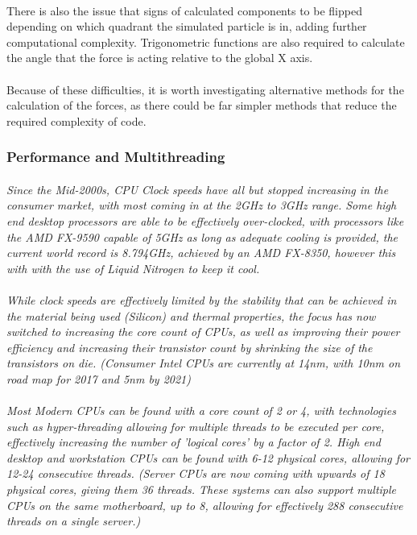 \paragraph{}
There is also the issue that signs of calculated components to be flipped depending on which quadrant the simulated particle is in, adding further computational complexity. Trigonometric functions are also required to calculate the angle that the force is acting relative to the global X axis.

\paragraph{}
Because of these difficulties, it is worth investigating alternative methods for the calculation of the forces, as there could be far simpler methods that reduce the required complexity of code.

\subsubsection{Performance and Multithreading}

\paragraph{}
\textit{Since the Mid-2000s, CPU Clock speeds have all but stopped increasing in the consumer market, with most coming in at the 2GHz to 3GHz range. Some high end desktop processors are able to be effectively over-clocked, with processors like the AMD FX-9590 capable of 5GHz as long as adequate cooling is provided, the current world record is 8.794GHz, achieved by an AMD FX-8350, however this with with the use of Liquid Nitrogen to keep it cool.}

\paragraph{}
\textit{While clock speeds are effectively limited by the stability that can be achieved in the material being used (Silicon) and thermal properties, the focus has now switched to increasing the core count of CPUs, as well as improving their power efficiency and increasing their transistor count by shrinking the size of the transistors on die. (Consumer Intel CPUs are currently at 14nm, with 10nm on road map for 2017 and 5nm by 2021)}

\paragraph{}
\textit{Most Modern CPUs can be found with a core count of 2 or 4, with technologies such as hyper-threading allowing for multiple threads to be executed per core, effectively increasing the number of 'logical cores' by a factor of 2. High end desktop and workstation CPUs can be found with 6-12 physical cores, allowing for 12-24 consecutive threads. (Server CPUs are now coming with upwards of 18 physical cores, giving them 36 threads. These systems can also support multiple CPUs on the same motherboard, up to 8, allowing for effectively 288 consecutive threads on a single server.)}

